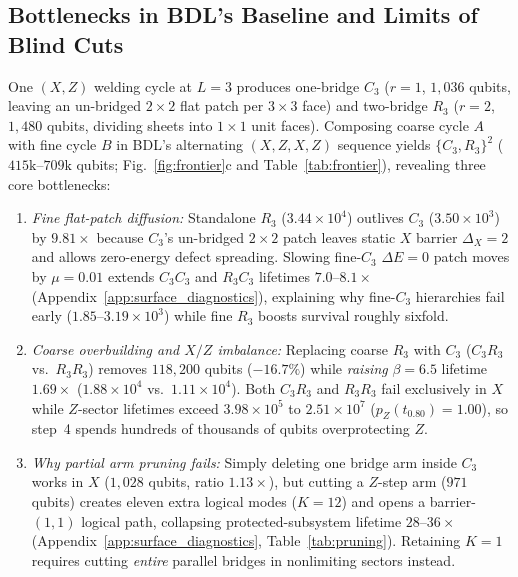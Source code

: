 \documentclass[aps,prx,reprint,superscriptaddress,nofootinbib,floatfix]{revtex4-2}
\begin{document}
\subsection{Bottlenecks in BDL's Baseline and Limits of Blind Cuts}

One $(X, Z)$ welding cycle at $L = 3$ produces one-bridge $C_3$ ($r = 1$, $1{,}036$ qubits, leaving an un-bridged $2 \times 2$ flat patch per $3 \times 3$ face) and two-bridge $R_3$ ($r = 2$, $1{,}480$ qubits, dividing sheets into $1 \times 1$ unit faces). Composing coarse cycle $A$ with fine cycle $B$ in BDL's alternating $(X, Z, X, Z)$ sequence yields $\{C_3, R_3\}^2$ ($415\mathrm{k}\text{--}709\mathrm{k}$ qubits; Fig.~\ref{fig:frontier}c and Table~\ref{tab:frontier}), revealing three core bottlenecks:
\begin{enumerate}
  \item \emph{Fine flat-patch diffusion:} Standalone $R_3$ ($3.44 \times 10^4$) outlives $C_3$ ($3.50 \times 10^3$) by $9.81\times$ because $C_3$'s un-bridged $2 \times 2$ patch leaves static $X$ barrier $\Delta_X = 2$ and allows zero-energy defect spreading. Slowing fine-$C_3$ $\Delta E = 0$ patch moves by $\mu = 0.01$ extends $C_3 C_3$ and $R_3 C_3$ lifetimes $7.0\text{--}8.1\times$ (Appendix~\ref{app:surface_diagnostics}), explaining why fine-$C_3$ hierarchies fail early ($1.85\text{--}3.19 \times 10^3$) while fine $R_3$ boosts survival roughly sixfold.
  \item \emph{Coarse overbuilding and $X/Z$ imbalance:} Replacing coarse $R_3$ with $C_3$ ($C_3 R_3$ vs.\ $R_3 R_3$) removes $118{,}200$ qubits ($-16.7\%$) while \emph{raising} $\beta = 6.5$ lifetime $1.69\times$ ($1.88 \times 10^4$ vs.\ $1.11 \times 10^4$). Both $C_3 R_3$ and $R_3 R_3$ fail exclusively in $X$ while $Z$-sector lifetimes exceed $3.98 \times 10^5$ to $2.51 \times 10^7$ ($p_Z(t_{0.80}) = 1.00$), so step~4 spends hundreds of thousands of qubits overprotecting $Z$.
  \item \emph{Why partial arm pruning fails:} Simply deleting one bridge arm inside $C_3$ works in $X$ ($1{,}028$ qubits, ratio $1.13\times$), but cutting a $Z$-step arm ($971$ qubits) creates eleven extra logical modes ($K = 12$) and opens a barrier-$(1, 1)$ logical path, collapsing protected-subsystem lifetime $28\text{--}36\times$ (Appendix~\ref{app:surface_diagnostics}, Table~\ref{tab:pruning}). Retaining $K = 1$ requires cutting \emph{entire} parallel bridges in nonlimiting sectors instead.
\end{enumerate}
\end{document}
